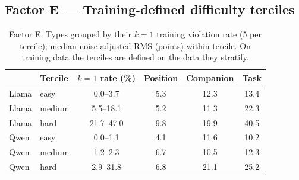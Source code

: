 \subsection*{Factor E --- Training-defined difficulty terciles}
\begin{table}[h]
\centering\scriptsize
\caption{Factor E. Types grouped by their $k=1$ training violation rate (5 per tercile); median noise-adjusted RMS (points) within tercile. On training data the terciles are defined on the data they stratify.}
\label{tab:E}
\begin{tabular}{llcccc}
\toprule
 & Tercile & $k{=}1$ rate (\%) & Position & Companion & Task \\
\midrule
Llama & easy & 0.0--3.7 & 5.3 & 12.3 & 13.4 \\
Llama & medium & 5.5--18.1 & 5.2 & 11.3 & 22.3 \\
Llama & hard & 21.7--47.0 & 9.8 & 19.9 & 40.5 \\
\midrule
Qwen & easy & 0.0--1.1 & 4.1 & 11.6 & 10.2 \\
Qwen & medium & 1.2--2.3 & 6.7 & 10.5 & 12.3 \\
Qwen & hard & 2.9--31.8 & 6.8 & 21.1 & 25.2 \\
\bottomrule
\end{tabular}
\end{table}

